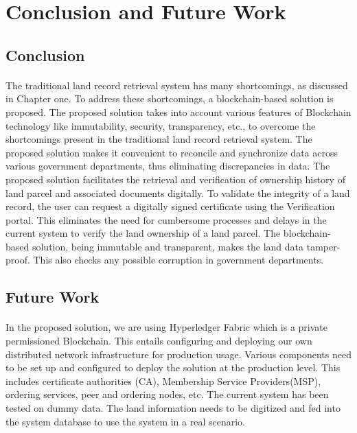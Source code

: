 \documentclass[12pt]{article}
\begin{document}
    \section{Conclusion and Future Work}
        \subsection{Conclusion}
            \paragraph{}
            The traditional land record retrieval system has many shortcomings, as discussed in Chapter one. To address these shortcomings, a blockchain-based solution is proposed. The proposed solution takes into account various features of Blockchain technology like immutability, security, transparency, etc., to overcome the shortcomings present in the traditional land record retrieval system. The proposed solution makes it convenient to reconcile and synchronize data across various government departments, thus eliminating discrepancies in data. The proposed solution facilitates the retrieval and verification of ownership history of land parcel and associated documents digitally. To validate the integrity of a land record, the user can request a digitally signed certificate using the Verification portal. This eliminates the need for cumbersome processes and delays in the current system to verify the land ownership of a land parcel. The blockchain-based solution, being immutable and transparent, makes the land data tamper-proof. This also checks any possible corruption in government departments.
        
        \subsection{Future Work}
            \paragraph{}
            In the proposed solution, we are using Hyperledger Fabric \cite{fabric} which is a private permissioned Blockchain. This entails configuring and deploying our own distributed network infrastructure for production usage. Various components need to be set up and configured to deploy the solution at the production level. This includes certificate authorities (CA), Membership Service Providers(MSP), ordering services, peer and ordering nodes, etc. The current system has been tested on dummy data. The land information needs to be digitized and fed into the system database to use the system in a real scenario. 
            
\end{document}

